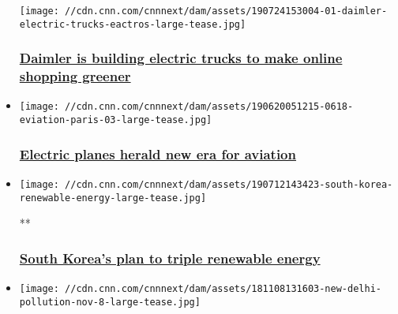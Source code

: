 \begin{itemize}
  \texttt{[image: //cdn.cnn.com/cnnnext/dam/assets/190724153004-01-daimler-electric-trucks-eactros-large-tease.jpg]}

  \hypertarget{daimler-is-building-electric-trucks-to-make-online-shopping-greener}{%
  \subsubsection{\texorpdfstring{\href{/2019/07/29/business/daimler-electric-trucks/index.html}{Daimler
  is building electric trucks to make online shopping
  greener}}{Daimler is building electric trucks to make online shopping greener}}\label{daimler-is-building-electric-trucks-to-make-online-shopping-greener}}
\item
  \href{/2019/06/20/business/electric-planes-paris-air-show/index.html}{}

  \texttt{[image: //cdn.cnn.com/cnnnext/dam/assets/190620051215-0618-eviation-paris-03-large-tease.jpg]}

  \hypertarget{electric-planes-herald-new-era-for-aviation-}{%
  \subsubsection{\texorpdfstring{\href{/2019/06/20/business/electric-planes-paris-air-show/index.html}{Electric
  planes herald new era for aviation
  }}{Electric planes herald new era for aviation }}\label{electric-planes-herald-new-era-for-aviation-}}
\item
  \href{/videos/business/2019/07/12/south-korea-renewable-energy-global-energy-challenge-qmb.cnn}{}

  \texttt{[image: //cdn.cnn.com/cnnnext/dam/assets/190712143423-south-korea-renewable-energy-large-tease.jpg]}

  **

  \hypertarget{south-koreas-plan-to-triple-renewable-energy}{%
  \subsubsection{\texorpdfstring{\href{/videos/business/2019/07/12/south-korea-renewable-energy-global-energy-challenge-qmb.cnn}{South
  Korea's plan to triple renewable
  energy}}{South Korea's plan to triple renewable energy}}\label{south-koreas-plan-to-triple-renewable-energy}}
\item
  \href{/2019/07/11/business/india-energy-coal/index.html}{}

  \texttt{[image: //cdn.cnn.com/cnnnext/dam/assets/181108131603-new-delhi-pollution-nov-8-large-tease.jpg]}


\end{itemize}
